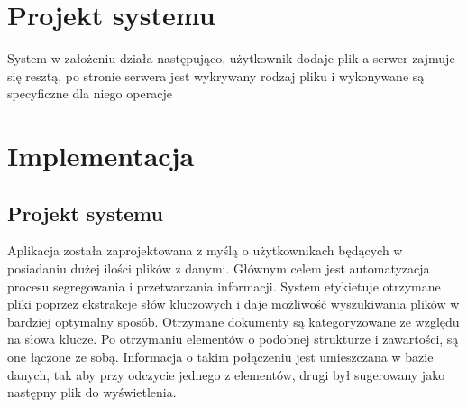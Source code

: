 \documentclass[12pt,a4paper,twoside]{article}
\begin{document}
\section{Projekt systemu}
System w założeniu działa następująco, użytkownik dodaje plik a serwer zajmuje się resztą, po stronie serwera jest wykrywany rodzaj pliku i wykonywane są specyficzne dla niego operacje
\section{Implementacja}
\subsection{Projekt systemu}
Aplikacja została zaprojektowana z myślą o użytkownikach będących w posiadaniu dużej ilości plików z danymi. Głównym celem jest automatyzacja procesu segregowania i przetwarzania informacji. System etykietuje otrzymane pliki poprzez ekstrakcje słów kluczowych i daje możliwość wyszukiwania plików w bardziej optymalny sposób. Otrzymane dokumenty są kategoryzowane ze względu na słowa klucze. Po otrzymaniu elementów o podobnej strukturze i zawartości, są one łączone ze sobą. Informacja o takim połączeniu jest umieszczana w bazie danych, tak aby przy odczycie jednego z elementów, drugi był sugerowany jako następny plik do wyświetlenia. \par
\end{document}
